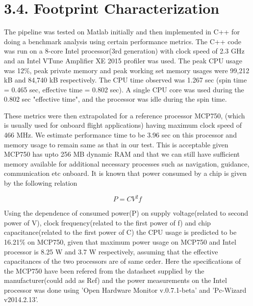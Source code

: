\documentclass{article}
\title{}
\author{}
\date{\vspace{-5ex}}
\begin{document}
	\maketitle
	
	\section*{3.4. Footprint Characterization}
The pipeline was tested on Matlab initially and then implemented in C++ for doing a benchmark analysis using certain performance metrics. The C++ code was run on a 8-core Intel processor(3rd generation) with clock speed of 2.3 GHz and an Intel VTune Amplifier XE 2015 profiler was used. The peak CPU usage was 12\%, peak private memory and peak working set memory usages were 99,212 kB and 84,740 kB respectively. The CPU time observed was 1.267 sec (spin time = 0.465 sec, effective time = 0.802 sec). A single CPU core was used during the 0.802 sec "effective time", and the processor was idle during the spin time. \newline

These metrics were then extrapolated for a reference processor MCP750, (which is usually used for onboard flight applications)  having maximum clock speed of 466 MHz. We estimate performance time to be 3.96 sec on this processor and memory usage to remain same as that in our test.  This is acceptable given MCP750 has upto 256 MB dynamic RAM and that we can still have sufficient memory available for additional necessary processes such as navigation, guidance, communication etc onboard. It is known that power consumed by a chip is given by the following relation

\begin{equation}
P=CV^{2}f
\end{equation}



Using the dependence of consumed power(P) on supply voltage(related to second power of V), clock frequency(related to the first power of f) and chip capacitance(related to the first power of C) the CPU usage is predicted to be 16.21\% on MCP750, given that maximum power usage on MCP750 and Intel processor is 8.25 W and 3.7 W respectively, assuming that the effective capacitances of the two processors are of same order. Here the specifications of the MCP750 have been refered from the datasheet supplied by the manufacturer(could add as Ref) and the power measurements on the Intel processor was done using 'Open Hardware Monitor v.0.7.1-beta' and 'Pc-Wizard v2014.2.13'. 


	
\end{document}
